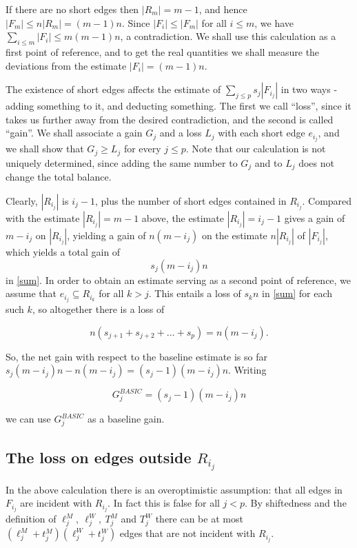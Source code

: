 \documentclass{amsart}
\theoremstyle{remark}
\newcommand{\lijm}{\ell_{j}^M}
\newcommand{\lijw}{\ell_{j}^W}
\newcommand{\eij}{e_{i_j}}
\newcommand{\rij}{R_{i_j}}
\newcommand{\fij}{F_{i_j}}
\newcommand{\Fij}{F_{i_j}}
\newcommand{\tjw}{t^W_j}
\begin{document}
 If there are no
short edges then  $|R_m|=m-1$, and hence $|F_m|\le n|R_m| =(m-1)n$.
Since $|F_i|\le |F_m|$ for all $i\le m$, we have $\sum_{i \le
m}|F_i| \le m(m-1)n$, a contradiction.
 We shall use this calculation as a first point of reference, and to get the real quantities we shall measure the deviations from the estimate
  $|F_i|=(m-1)n$.




The existence of short edges affects the estimate of $\sum_{j \le
p}s_j|\Fij|$ in two ways - adding something to it, and deducting
something.
  The first we call ``loss'', since it takes us further away from the desired contradiction,
and the second  is called  ``gain''. We shall associate a gain $G_j$ and a  loss $L_j$ with each short edge $\eij$,
and we shall show that $G_j \ge L_j$ for every $j\le p$.  Note that our calculation is not uniquely determined,
since adding  the same number to  $G_j$ and to $L_j$ does not change the total balance.


 Clearly, $|\rij|$
 is $i_j-1$, plus the number of short  edges contained in $\rij$. Compared with the  estimate $|\rij|=m-1$ above, the estimate
 $|\rij|=i_j-1$
gives a gain of $m-i_j$ on $|\rij|$, yielding a gain of $n(m-i_j)$ on the estimate $n|\rij|$ of $|\fij|$, which yields a total
gain of $$s_j(m-i_j)n$$ in \eqref{sum}.
In order to obtain an estimate serving as a second point of reference, we assume that $e_{i_j}\subseteq R_{i_k}$ for all $k>j$.
This  entails a loss of $s_kn$ in \eqref{sum} for each such $k$, so altogether there is a loss of

$$
n(s_{j+1}+s_{j+2}+\ldots +s_p)=n(m-i_j).
$$

So, the net gain with respect to the baseline estimate   is so far $s_j(m-i_j)n - n(m-i_j)=(s_j-1)(m-i_j)n$. Writing

\begin{equation}\label{firstnetgain}
G^{BASIC}_j=(s_j-1)(m-i_j)n
\end{equation}

we can use $G^{BASIC}_j$ as a baseline gain.



\subsection{The loss on edges outside $\rij$}
In the above calculation there is an overoptimistic assumption: that
all edges in $\fij$ are  incident with $\rij$. In fact this  is
false for all $j<p$. By shiftedness and the definition of $\lijm,~
\lijw,~ T_j^M$ and $T_j^W$ there can be at most
$(\lijm+t^M_j)(\lijw+\tjw)$ edges that are not incident with $\rij$.
\end{document}
